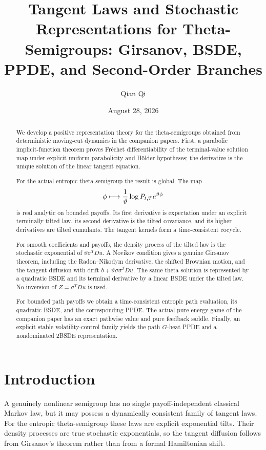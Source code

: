 \documentclass[11pt,reqno]{amsart}
\title[Tangent laws and stochastic representations]{Tangent Laws and Stochastic Representations for Theta-Semigroups: Girsanov, BSDE, PPDE, and Second-Order Branches}
\author{Qian Qi}
\date{August 28, 2026}
\theoremstyle{definition}
\theoremstyle{remark}
\begin{document}
\begin{abstract}
We develop a positive representation theory for the theta-semigroups obtained
from deterministic moving-cut dynamics in the companion papers.  First, a
parabolic implicit-function theorem proves Fr\'echet differentiability of the
terminal-value solution map under explicit uniform parabolicity and H\"older
hypotheses; the derivative is the unique solution of the linear tangent
equation.

For the actual entropic theta-semigroup the result is global.  The map
\[
 \phi\longmapsto {1\over\vartheta}
 \log P_{t,T}e^{\vartheta\phi}
\]
is real analytic on bounded payoffs.  Its first derivative is expectation
under an explicit terminally tilted law, its second derivative is the tilted
covariance, and its higher derivatives are tilted cumulants.  The tangent
kernels form a time-consistent cocycle.

For smooth coefficients and payoffs, the density process of the tilted law is
the stochastic exponential of $\vartheta\sigma^TDu$.  A Novikov condition
gives a genuine Girsanov theorem, including the Radon--Nikodym derivative, the
shifted Brownian motion, and the tangent diffusion with drift
$b+\vartheta\sigma\sigma^TDu$.  The same theta solution is represented by a
quadratic BSDE and its terminal derivative by a linear BSDE under the tilted
law.  No inversion of $Z=\sigma^TDu$ is used.

For bounded path payoffs we obtain a time-consistent entropic path evaluation,
its quadratic BSDE, and the corresponding PPDE.  The actual pure energy game
of the companion paper has an exact pathwise value and pure feedback saddle.
Finally, an explicit stable volatility-control family yields the path
$G$-heat PPDE and a nondominated 2BSDE representation.
\end{abstract}
\maketitle
\tableofcontents

\section{Introduction}
A genuinely nonlinear semigroup has no single payoff-independent classical
Markov law, but it may possess a dynamically consistent family of tangent
laws.  For the entropic theta-semigroup these laws are explicit exponential
tilts.  Their density processes are true stochastic exponentials, so the
tangent diffusion follows from Girsanov's theorem rather than from a formal
Hamiltonian shift.
\end{document}
